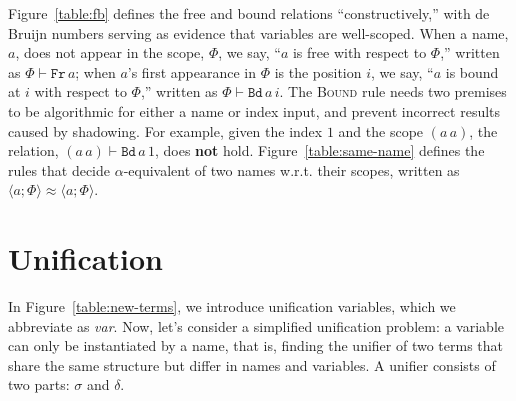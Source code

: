 \documentclass[a4paper,UKenglish]{lipics-v2016}
\newcommand{\clos}[2] {
\langle #1; #2 \rangle
}
\newcommand{\aeq}[4] {
\clos{#1}{#2} \approx \clos{#3}{#4}
}
\newcommand*{\transname}[1]{\textsc{#1}}
\begin{document}
Figure~\ref{table:fb} defines the free and bound relations
``constructively,'' with de Bruijn numbers serving as
evidence that variables are well-scoped. When a name, $a$, does not
appear in the scope, $\Phi$, we say, ``$a$ is free with respect to
$\Phi$,'' written as $\Phi \vdash \texttt{Fr}\, a$; when $a$'s first
appearance in $\Phi$ is the position $i$, we say, ``$a$ is bound at
$i$ with respect to $\Phi$,'' written as $\Phi \vdash \texttt{Bd}\,
a\,i$. The \transname{Bound} rule needs two premises to be algorithmic
for either a name or index input,
and prevent incorrect results caused by shadowing.
For example, given the index $1$ and the scope $(a\,a)$,
the relation, $(a\,a) \vdash \texttt{Bd}\,a\,1$, does \textbf{not} hold.
Figure~\ref{table:same-name} defines the rules that decide
$\alpha$-equivalent of two names w.r.t. their scopes, written as
$\aeq{a}{\Phi}{a}{\Phi}$. 

\section{Unification}
\label{unify}
In Figure~\ref{table:new-terms}, we introduce unification variables,
which we abbreviate as \emph{var}. Now, let's consider a simplified
unification problem: a variable can only be instantiated by a name, that is,
finding the unifier of two terms that share the same structure but
differ in names and variables. A unifier consists of two parts:
$\sigma$ and $\delta$.
\end{document}

